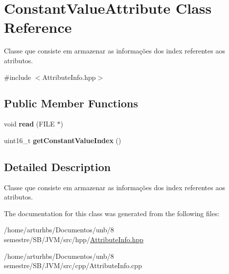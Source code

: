\hypertarget{classConstantValueAttribute}{}\section{Constant\+Value\+Attribute Class Reference}
\label{classConstantValueAttribute}


Classe que consiste em armazenar as informações dos index referentes aos atributos.  




{\ttfamily \#include $<$Attribute\+Info.\+hpp$>$}

\subsection*{Public Member Functions}
\begin{DoxyCompactItemize}
\item 
void {\bfseries read} (F\+I\+LE $\ast$)\hypertarget{classConstantValueAttribute_a736510ad35810b8b06b7fed1065b5f9f}{}\label{classConstantValueAttribute_a736510ad35810b8b06b7fed1065b5f9f}

\item 
uint16\+\_\+t {\bfseries get\+Constant\+Value\+Index} ()\hypertarget{classConstantValueAttribute_ab8f66dc68583f523e052482f14e44c9d}{}\label{classConstantValueAttribute_ab8f66dc68583f523e052482f14e44c9d}

\end{DoxyCompactItemize}


\subsection{Detailed Description}
Classe que consiste em armazenar as informações dos index referentes aos atributos. 

The documentation for this class was generated from the following files\+:\begin{DoxyCompactItemize}
\item 
/home/arturhbs/\+Documentos/unb/8 semestre/\+S\+B/\+J\+V\+M/src/hpp/\hyperlink{AttributeInfo_8hpp}{Attribute\+Info.\+hpp}\item 
/home/arturhbs/\+Documentos/unb/8 semestre/\+S\+B/\+J\+V\+M/src/cpp/Attribute\+Info.\+cpp\end{DoxyCompactItemize}

